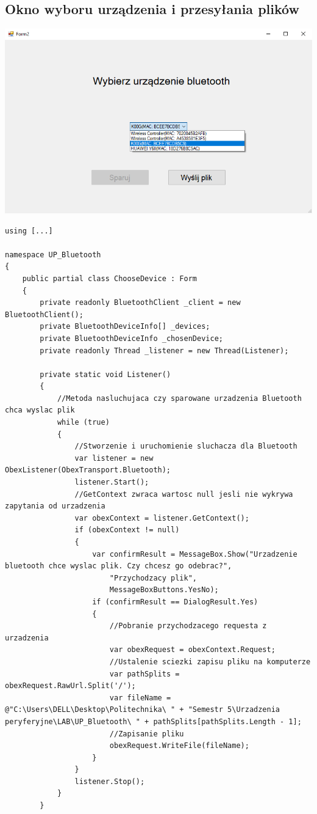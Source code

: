 \documentclass[12pt,a4paper,notitlepage]{report}
\begin{document}
\begin{adjustwidth}{0pt}{-50pt}
\begin{lstlisting}
\end{lstlisting}
\newpage
\subsection{Okno wyboru urządzenia i przesyłania plików}

\noindent \includegraphics[scale=0.7]{ChooseDevice}
\begin{lstlisting}
using [...]

namespace UP_Bluetooth
{
    public partial class ChooseDevice : Form
    {
        private readonly BluetoothClient _client = new BluetoothClient();
        private BluetoothDeviceInfo[] _devices;
        private BluetoothDeviceInfo _chosenDevice;
        private readonly Thread _listener = new Thread(Listener);

        private static void Listener()
        {
            //Metoda nasluchujaca czy sparowane urzadzenia Bluetooth chca wyslac plik
            while (true)
            {
                //Stworzenie i uruchomienie sluchacza dla Bluetooth
                var listener = new ObexListener(ObexTransport.Bluetooth);
                listener.Start();
                //GetContext zwraca wartosc null jesli nie wykrywa zapytania od urzadzenia
                var obexContext = listener.GetContext();
                if (obexContext != null)
                {
                    var confirmResult = MessageBox.Show("Urzadzenie bluetooth chce wyslac plik. Czy chcesz go odebrac?",
                        "Przychodzacy plik",
                        MessageBoxButtons.YesNo);
                    if (confirmResult == DialogResult.Yes)
                    {
                        //Pobranie przychodzacego requesta z urzadzenia
                        var obexRequest = obexContext.Request;
                        //Ustalenie sciezki zapisu pliku na komputerze
                        var pathSplits = obexRequest.RawUrl.Split('/');
                        var fileName = @"C:\Users\DELL\Desktop\Politechnika\ " + "Semestr 5\Urzadzenia peryferyjne\LAB\UP_Bluetooth\ " + pathSplits[pathSplits.Length - 1];
                        //Zapisanie pliku
                        obexRequest.WriteFile(fileName);
                    }
                }
                listener.Stop();
            }
        }


\end{lstlisting}
\end{adjustwidth}
\end{document}

